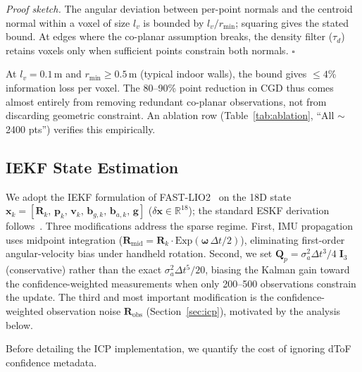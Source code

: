 \documentclass[journal]{IEEEtran}
\begin{document}
\textit{Proof sketch.} The angular deviation between per-point normals and the centroid normal within a voxel of size $l_v$ is bounded by $l_v/r_{\min}$; squaring gives the stated bound. At edges where the co-planar assumption breaks, the density filter ($\tau_d$) retains voxels only when sufficient points constrain both normals. \hfill$\square$

At $l_v = 0.1$\,m and $r_{\min} \geq 0.5$\,m (typical indoor walls), the bound gives $\leq 4$\% information loss per voxel. The 80--90\% point reduction in CGD thus comes almost entirely from removing redundant co-planar observations, not from discarding geometric constraint. An ablation row (Table~\ref{tab:ablation}, ``All ${\sim}$2400 pts'') verifies this empirically.

\subsection{IEKF State Estimation}
\label{sec:fisher}

We adopt the IEKF formulation of FAST-LIO2~\cite{xu2021fastlio,xu2022fastlio2} on the 18D state $\mathbf{x}_k = [\mathbf{R}_k,\,\mathbf{p}_k,\,\mathbf{v}_k,\,\mathbf{b}_{g,k},\,\mathbf{b}_{a,k},\,\mathbf{g}]$ ($\delta\mathbf{x} \in \mathbb{R}^{18}$); the standard ESKF derivation follows~\cite{sola2017quaternion,barfoot2017state}. Three modifications address the sparse regime. First, IMU propagation uses midpoint integration ($\mathbf{R}_{\text{mid}} = \mathbf{R}_k \cdot \text{Exp}(\boldsymbol{\omega}\,\Delta t / 2)$), eliminating first-order angular-velocity bias under handheld rotation. Second, we set $\mathbf{Q}_p = \sigma_a^2 \Delta t^3/4\;\mathbf{I}_3$ (conservative) rather than the exact $\sigma_a^2 \Delta t^5/20$, biasing the Kalman gain toward the confidence-weighted measurements when only 200--500 observations constrain the update. The third and most important modification is the confidence-weighted observation noise $\mathbf{R}_{\text{obs}}$ (Section~\ref{sec:icp}), motivated by the analysis below.

Before detailing the ICP implementation, we quantify the cost of ignoring dToF confidence metadata.
\end{document}
